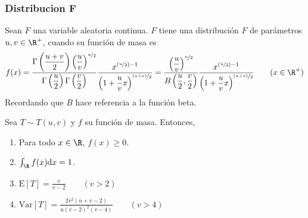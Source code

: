 \subsubsection{Distribucion F}

\begin{Def}
  Sean $F$ una variable aleatoria continua. $F$ tiene una distribución
  $F$ de parámetros $u,v\in\R^+$, cuando su función de masa es
  \[f(x)=
  \dfrac{\Gamma\left(\frac{u+v}{2}\right)\left(\frac{u}{v}\right)^{\nicefrac{u}{2}}}
  {\Gamma\left(\frac{u}{2}\right)\Gamma\left(\frac{v}{2}\right)}
  \dfrac{x^{(\nicefrac{u}{2})-1}}
  {\left(1 + \frac{u}{v}x\right)^{\nicefrac{(u+v)}{2}}}
  =
  \dfrac{\left(\frac{u}{v}\right)^{\nicefrac{u}{2}}}
    {B\left(\frac{u}{2},\frac{v}{2}\right)}
  \dfrac{x^{(\nicefrac{u}{2})-1}}
    {\left(1 + \frac{u}{v}x\right)^{\nicefrac{(u+v)}{2}}}
  \qquad (x\in\R^+)
  \]
  Recordando que $B$ hace referencia a la función beta.
\end{Def}
\begin{Teo}
  Sea $T\sim T(u,v)$ y $f$ su función de masa. Entonces,
  \begin{enumerate}
    \item Para todo $x\in\R$, $f(x) \geq 0$.
    \item $\int_{\R}f(x)\mathrm{d}x=1$.
    \item $\text{E}[T]=\frac{v}{v-2} \qquad(v>2)$
    \item $\text{Var}[T]=\frac{2v^2(u+v-2)}{u(v-2)^2(v-4)}\qquad(v>4)$
  \end{enumerate}
\end{Teo}
